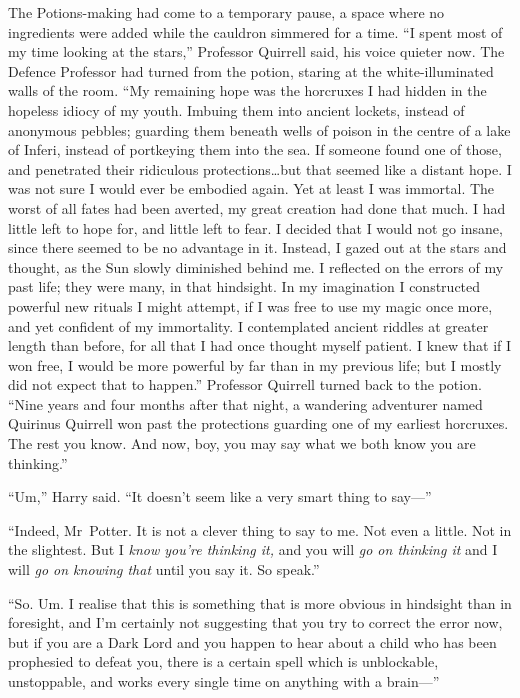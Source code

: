 The Potions-making had come to a temporary pause, a space where no ingredients were added while the cauldron simmered for a time. “I spent most of my time looking at the stars,” Professor Quirrell said, his voice quieter now. The Defence Professor had turned from the potion, staring at the white-illuminated walls of the room. “My remaining hope was the horcruxes I had hidden in the hopeless idiocy of my youth. Imbuing them into ancient lockets, instead of anonymous pebbles; guarding them beneath wells of poison in the centre of a lake of Inferi, instead of portkeying them into the sea. If someone found one of those, and penetrated their ridiculous protections…but that seemed like a distant hope. I was not sure I would ever be embodied again. Yet at least I was immortal. The worst of all fates had been averted, my great creation had done that much. I had little left to hope for, and little left to fear. I decided that I would not go insane, since there seemed to be no advantage in it. Instead, I gazed out at the stars and thought, as the Sun slowly diminished behind me. I reflected on the errors of my past life; they were many, in that hindsight. In my imagination I constructed powerful new rituals I might attempt, if I was free to use my magic once more, and yet confident of my immortality. I contemplated ancient riddles at greater length than before, for all that I had once thought myself patient. I knew that if I won free, I would be more powerful by far than in my previous life; but I mostly did not expect that to happen.” Professor Quirrell turned back to the potion. “Nine years and four months after that night, a wandering adventurer named Quirinus Quirrell won past the protections guarding one of my earliest horcruxes. The rest you know. And now, boy, you may say what we both know you are thinking.”

“Um,” Harry said. “It doesn’t seem like a very smart thing to say—”

“Indeed, Mr~Potter. It is not a clever thing to say to me. Not even a little. Not in the slightest. But I \emph{know you’re thinking it,} and you will \emph{go on thinking it} and I will \emph{go on knowing that} until you say it. So speak.”

“So. Um. I realise that this is something that is more obvious in hindsight than in foresight, and I’m certainly not suggesting that you try to correct the error now, but if you are a Dark Lord and you happen to hear about a child who has been prophesied to defeat you, there is a certain spell which is unblockable, unstoppable, and works every single time on anything with a brain—”

